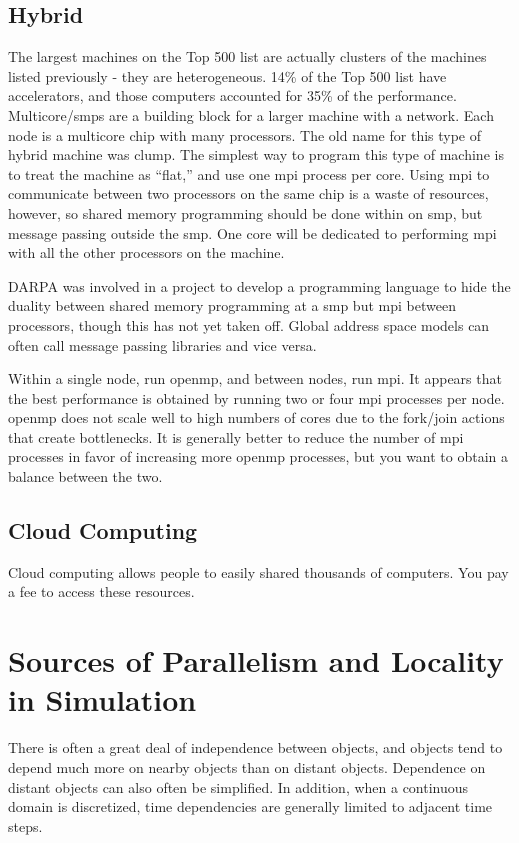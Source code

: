 \documentclass[10pt]{article}
\begin{document}
\begin{flushleft}
\subsection{Hybrid}

The largest machines on the Top 500 list are actually clusters of the machines listed previously - they are heterogeneous. 14\% of the Top 500 list have accelerators, and those computers accounted for 35\% of the performance. Multicore/\gls{smp}s are a building block for a larger machine with a network. Each node is a multicore chip with many processors. The old name for this type of hybrid machine was \gls{clump}. The simplest way to program this type of machine is to treat the machine as ``flat,'' and use one \gls{mpi} process per core. Using \gls{mpi} to communicate between two processors on the same chip is a waste of resources, however, so shared memory programming should be done within on \gls{smp}, but message passing outside the \gls{smp}. One core will be dedicated to performing \gls{mpi} with all the other processors on the machine. 

DARPA was involved in a project to develop a programming language to hide the duality between shared memory programming at a \gls{smp} but \gls{mpi} between processors, though this has not yet taken off. Global address space models can often call message passing libraries and vice versa. 

Within a single node, run \gls{openmp}, and between nodes, run \gls{mpi}. It appears that the best performance is obtained by running two or four \gls{mpi} processes per node. \gls{openmp} does not scale well to high numbers of cores due to the fork/join actions that create bottlenecks. It is generally better to reduce the number of \gls{mpi} processes in favor of increasing more \gls{openmp} processes, but you want to obtain a balance between the two.

\subsection{Cloud Computing}

Cloud computing allows people to easily shared thousands of computers. You pay a fee to access these resources.

\section{Sources of Parallelism and Locality in Simulation}

There is often a great deal of independence between objects, and objects tend to depend much more on nearby objects than on distant objects. Dependence on distant objects can also often be simplified. In addition, when a continuous domain is discretized, time dependencies are generally limited to adjacent time steps. 


\end{flushleft}
\end{document}
